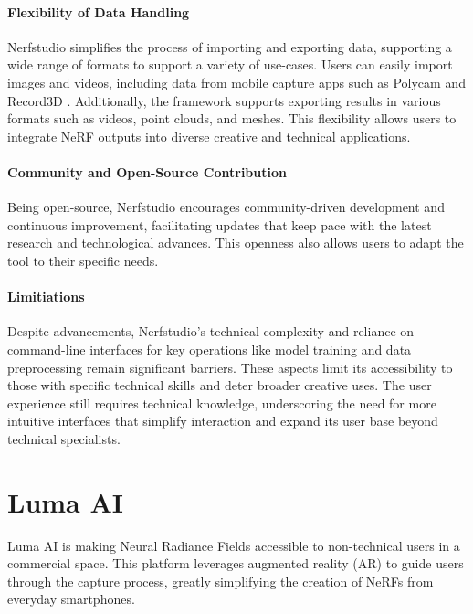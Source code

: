 \paragraph{Flexibility of Data Handling}
Nerfstudio simplifies the process of importing and exporting data, supporting a wide range of formats to support a variety of use-cases.
Users can easily import images and videos, including data from mobile capture apps such as Polycam \cite{noauthor_polycam_nodate} and Record3D \cite{noauthor_record3d_nodate}.
Additionally, the framework supports exporting results in various formats such as videos, point clouds, and meshes.
This flexibility allows users to integrate NeRF outputs into diverse creative and technical applications.

\paragraph{Community and Open-Source Contribution}
Being open-source, Nerfstudio encourages community-driven development and continuous improvement, facilitating updates that keep pace with the latest research and technological advances.
This openness also allows users to adapt the tool to their specific needs.

\paragraph{Limitiations}

Despite advancements, Nerfstudio's technical complexity and reliance on command-line interfaces for key operations like model training and data preprocessing remain significant barriers.
These aspects limit its accessibility to those with specific technical skills and deter broader creative uses.
The user experience still requires technical knowledge, underscoring the need for more intuitive interfaces that simplify interaction and expand its user base beyond technical specialists.

\section{Luma AI}
\label{sec:related:lmua}

Luma AI \cite{ai_luma_nodate} is making Neural Radiance Fields accessible to non-technical users in a commercial space.
This platform leverages augmented reality (AR) to guide users through the capture process, greatly simplifying the creation of NeRFs from everyday smartphones.

